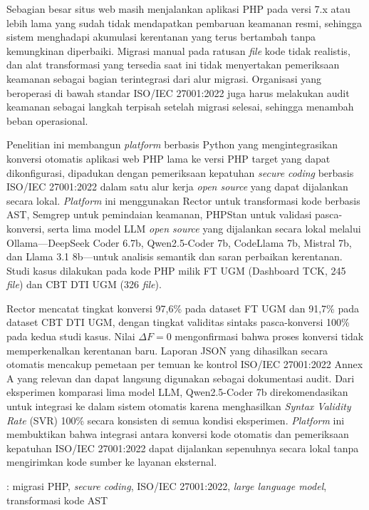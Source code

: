 Sebagian besar situs web masih menjalankan aplikasi PHP pada versi 7.x atau lebih lama yang sudah tidak mendapatkan pembaruan keamanan resmi, sehingga sistem menghadapi akumulasi kerentanan yang terus bertambah tanpa kemungkinan diperbaiki. Migrasi manual pada ratusan \textit{file} kode tidak realistis, dan alat transformasi yang tersedia saat ini tidak menyertakan pemeriksaan keamanan sebagai bagian terintegrasi dari alur migrasi. Organisasi yang beroperasi di bawah standar ISO/IEC 27001:2022 juga harus melakukan audit keamanan sebagai langkah terpisah setelah migrasi selesai, sehingga menambah beban operasional.

\hspace{1cm} Penelitian ini membangun \textit{platform} berbasis Python yang mengintegrasikan konversi otomatis aplikasi web PHP lama ke versi PHP target yang dapat dikonfigurasi, dipadukan dengan pemeriksaan kepatuhan \textit{secure coding} berbasis ISO/IEC 27001:2022 dalam satu alur kerja \textit{open source} yang dapat dijalankan secara lokal. \textit{Platform} ini menggunakan Rector untuk transformasi kode berbasis AST, Semgrep untuk pemindaian keamanan, PHPStan untuk validasi pasca-konversi, serta lima model LLM \textit{open source} yang dijalankan secara lokal melalui Ollama---DeepSeek Coder 6.7b, Qwen2.5-Coder 7b, CodeLlama 7b, Mistral 7b, dan Llama 3.1 8b---untuk analisis semantik dan saran perbaikan kerentanan. Studi kasus dilakukan pada kode PHP milik FT UGM (Dashboard TCK, 245 \textit{file}) dan CBT DTI UGM (326 \textit{file}).

\hspace{1cm} Rector mencatat tingkat konversi 97,6\% pada dataset FT UGM dan 91,7\% pada dataset CBT DTI UGM, dengan tingkat validitas sintaks pasca-konversi 100\% pada kedua studi kasus. Nilai $\Delta F = 0$ mengonfirmasi bahwa proses konversi tidak memperkenalkan kerentanan baru. Laporan JSON yang dihasilkan secara otomatis mencakup pemetaan per temuan ke kontrol ISO/IEC 27001:2022 Annex A yang relevan dan dapat langsung digunakan sebagai dokumentasi audit. Dari eksperimen komparasi lima model LLM, Qwen2.5-Coder 7b direkomendasikan untuk integrasi ke dalam sistem otomatis karena menghasilkan \textit{Syntax Validity Rate} (SVR) 100\% secara konsisten di semua kondisi eksperimen. \textit{Platform} ini membuktikan bahwa integrasi antara konversi kode otomatis dan pemeriksaan kepatuhan ISO/IEC 27001:2022 dapat dijalankan sepenuhnya secara lokal tanpa mengirimkan kode sumber ke layanan eksternal.

 : migrasi PHP, \textit{secure coding}, ISO/IEC 27001:2022, \textit{large language model}, transformasi kode AST

